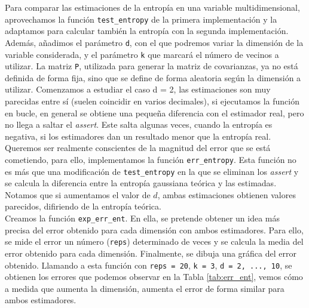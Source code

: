 \documentclass[12pt,a4paper]{report} %
\theoremstyle{definition}
\begin{document}
Para comparar las estimaciones de la entropía en una variable multidimensional, aprovechamos la función \texttt{test\_entropy} de la primera implementación y la adaptamos para calcular también la entropía con la segunda implementación. Además, añadimos el parámetro \texttt{d}, con el que podremos variar la dimensión de la variable considerada, y el parámetro \texttt{k} que marcará el número de vecinos a utilizar. La matriz \texttt{P}, utilizada para generar la matriz de covarianzas, ya no está definida de forma fija, sino que se define de forma aleatoria según la dimensión a utilizar. Comenzamos a estudiar el caso d = 2, las estimaciones son muy parecidas entre sí (suelen coincidir en varios decimales), si ejecutamos la función en bucle, en general se obtiene una pequeña diferencia con el estimador real, pero no llega a saltar el \textit{assert}. Este salta algunas veces, cuando la entropía es negativa, si los estimadores dan un resultado menor que la entropía real.\\

Queremos ser realmente conscientes de la magnitud del error que se está cometiendo, para ello, implementamos la función \texttt{err\_entropy}. Esta función no es más que una modificación de \texttt{test\_entropy} en la que se eliminan los \textit{assert} y se calcula la diferencia entre la entropía gaussiana teórica y las estimadas. Notamos que si aumentamos el valor de $d$, ambas estimaciones obtienen valores parecidos, difiriendo de la entropía teórica.\\

Creamos la función \texttt{exp\_err\_ent}. En ella, se pretende obtener un idea más precisa del error obtenido para cada dimensión con ambos estimadores. Para ello, se mide el error un número (\texttt{reps}) determinado de veces y se calcula la media del error obtenido para cada dimensión. Finalmente, se dibuja una gráfica del error obtenido. Llamando a esta función con \texttt{reps = 20}, \texttt{k = 3}, \texttt{d = 2, ..., 10}, se obtienen los errores que podemos observar en la Tabla \ref{tab:err_ent}, vemos cómo a medida que aumenta la dimensión, aumenta el error de forma similar para ambos estimadores.\\
\end{document}
